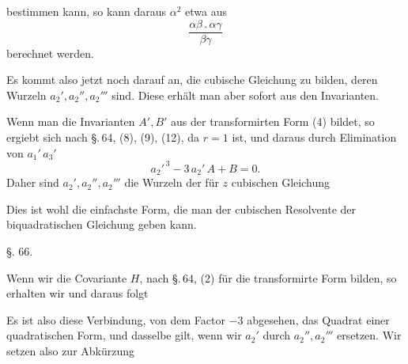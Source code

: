 bestimmen kann, so kann daraus $\alpha^2$ etwa aus
\[
\frac{\alpha\beta\,.\,\alpha\gamma}{\beta\gamma}
\]
berechnet werden.

Es kommt also jetzt noch darauf an, die cubische Gleichung
zu bilden, deren Wurzeln $a_2', a_2'', a_2'''$ sind. Diese erhält man
aber sofort aus den Invarianten.

Wenn man die Invarianten $A', B'$ aus der transformirten
Form (4) bildet, so ergiebt sich nach §.\,64, (8), (9), (12), da
$r = 1$ ist,
und daraus durch Elimination von $a_1'\,a_3'$
\[
a_2'^{\,3} - 3\,a_2'\,A + B = 0.
\]
Daher sind $a_2', a_2'', a_2'''$ die Wurzeln der für $z$ cubischen
Gleichung

Dies ist wohl die einfachste Form, die man der cubischen
Resolvente der biquadratischen Gleichung geben kann.

\begin{center}
§. 66.

\end{center}

Wenn wir die Covariante $H$, nach §.\,64, (2) für die transformirte
 Form
bilden, so erhalten wir
und daraus folgt

Es ist also diese Verbindung, von dem Factor $-3$ abgesehen,
das Quadrat einer quadratischen Form, und dasselbe gilt, wenn
wir $a_2'$ durch $a_2'', a_2'''$ ersetzen. Wir setzen also zur
Abkürzung
